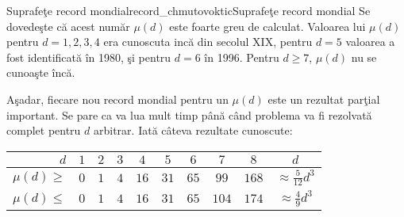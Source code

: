 \begin{surferIntroPage}{Suprafe\c{t}e record mondial}{record_chmutovoktic}{Suprafe\c{t}e record mondial}
   Se dovede\c{s}te c\u{a} acest num\u{a}r $\mu(d)$ este foarte greu de calculat.
   Valoarea lui $\mu(d)$ pentru $d=1,2,3,4$ era cunoscuta inc\u{a} din secolul XIX,
   pentru $d=5$ valoarea a fost identificat\u{a} \^{i}n 1980, \c{s}i pentru $d=6$ \^{i}n 1996.
   Pentru $d\ge 7$, $\mu(d)$ nu se cunoa\c{s}te \^{i}nc\u{a}.
   
   A\c{s}adar, fiecare nou record mondial pentru un $\mu(d)$ este un rezultat par\c{t}ial important.
   Se pare ca va lua mult timp p\^{a}n\u{a} c\^{a}nd problema va fi rezolvat\u{a} complet pentru $d$
   arbitrar. Iat\u{a} c\^{a}teva rezultate cunoscute:
    
   \begin{center}
      \begin{tabular}{r|cccccccc|c}
        $d$ & $1$ & $2$ & $3$ & $4$ & $5$ & $6$ & $7$ & $8$ & $d$\\
        \hline
        \hline
        \rule{0pt}{1.2em}$\mu(d)\ge$ & $0$ & $1$ & $4$ & $16$ & $31$ & $65$ &
        $99$ & $168$ &
        $\approx \frac{5}{12}d^3$\\[0.3em]
        \hline
        \rule{0pt}{1.2em}$\mu(d)\le$ & $0$ & $1$ & $4$ & $16$ & $31$ & $65$ &
        $104$ & $174$ & $\approx \frac{4}{9}d^3$
      \end{tabular}
    \end{center}
\end{surferIntroPage}
